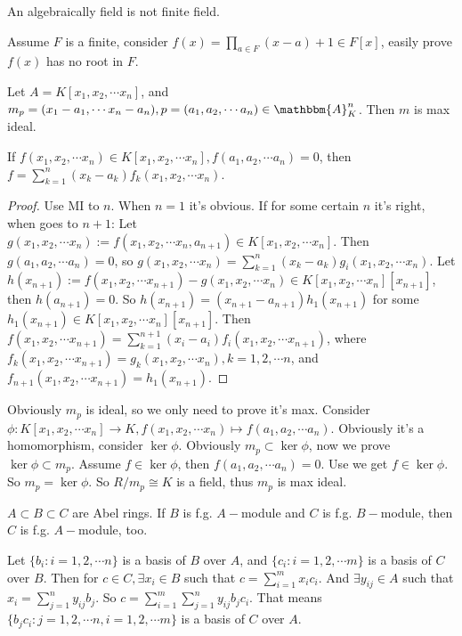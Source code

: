 \documentclass{ctexart}
\newcommand\<{\langle}
\renewcommand\>{\rangle}
\def\to{\rightarrow}
\newcommand{\A}{\mathbbm{A}}
\begin{document}
\begin{problem}
  An algebraically field is not finite field.
\end{problem}
\begin{solution}
  Assume $F$ is a finite, consider $f(x)=\prod_{a\in F}(x-a)+1\in F[x]$, easily prove $f(x)$ has no root in $F$.
\end{solution}
\begin{problem}
  Let $A=K[x_1,x_2,\cdots x_n]$, and $m_p=(x_1-a_1,\cdots x_n-a_n),p=(a_1,a_2,\cdots a_n)\in\A_K^n$. Then $m$ is max ideal.
\end{problem}
\begin{lemma}
  \label{lem:ker}
  If $f(x_1,x_2,\cdots x_n)\in K[x_1,x_2,\cdots x_n],f(a_1,a_2,\cdots a_n)=0$, then $f=\sum_{k=1}^n (x_k-a_k)f_k(x_1,x_2,\cdots x_n)$.
\end{lemma}
\begin{proof}
  Use MI to $n$. When $n=1$ it's obvious. If for some certain $n$ it's right, when goes to $n+1$: Let $g(x_1,x_2,\cdots x_n):=f(x_1,x_2,\cdots x_n,a_{n+1})\in K[x_1,x_2,\cdots x_n]$. Then $g(a_1,a_2,\cdots a_n)=0$, so $g(x_1,x_2,\cdots x_n)=\sum_{k=1}^n (x_k-a_k)g_i(x_1,x_2,\cdots x_n)$. Let $h(x_{n+1}):=f(x_1,x_2,\cdots x_{n+1})-g(x_1,x_2,\cdots x_n)\in K[x_1,x_2,\cdots x_n][x_{n+1}]$, then $h(a_{n+1})=0$. So $h(x_{n+1})=(x_{n+1}-a_{n+1})h_1(x_{n+1})$ for some $h_1(x_{n+1})\in K[x_1,x_2,\cdots x_n][x_{n+1}]$. Then $f(x_1,x_2,\cdots x_{n+1})=\sum_{k=1}^{n+1}(x_{i}-a_i)f_i(x_1,x_2,\cdots x_{n+1})$, where $f_k(x_1,x_2,\cdots x_{n+1})=g_k(x_1,x_2,\cdots x_n),k=1,2,\cdots n$, and $f_{n+1}(x_1,x_2,\cdots x_{n+1})=h_1(x_{n+1})$.
\end{proof}
\begin{solution}
  Obviously $m_p$ is ideal, so we only need to prove it's max. Consider $\phi:K[x_1,x_2,\cdots x_n]\to K,f(x_1,x_2,\cdots x_n)\mapsto f(a_1,a_2,\cdots a_n)$. Obviously it's a homomorphism, consider $\ker \phi$. Obviously $m_p\subset \ker \phi$, now we prove $\ker \phi\subset m_p$. Assume $f\in\ker\phi$, then $f(a_1,a_2,\cdots a_n)=0$. Use  we get $f\in\ker\phi$. So $m_p=\ker \phi$. So $R/m_p\cong K$ is a field, thus $m_p$ is max ideal.
\end{solution}

\begin{problem}
  $A\subset B\subset C$ are Abel rings. If $B$ is f.g. $A-$module and $C$ is f.g. $B-$module, then $C$ is f.g. $A-$module, too.
\end{problem}
\begin{solution}
  Let $\{b_i:i=1,2,\cdots n\}$ is a basis of $B$ over $A$, and $\{c_i:i=1,2,\cdots m\}$ is a basis of $C$ over $B$. Then for $c\in C,\exists x_i\in B$ such that $c=\sum_{i=1}^m x_i c_i$. And $\exists y_{ij}\in A$ such that $x_i=\sum_{j=1}^n y_{ij} b_j$. So $c=\sum_{i=1}^m\sum_{j=1}^n y_{ij} b_jc_i$. That means $\{b_jc_i:j=1,2,\cdots n,i=1,2,\cdots m\}$ is a basis of $C$ over $A$.
\end{solution}
\end{document}
